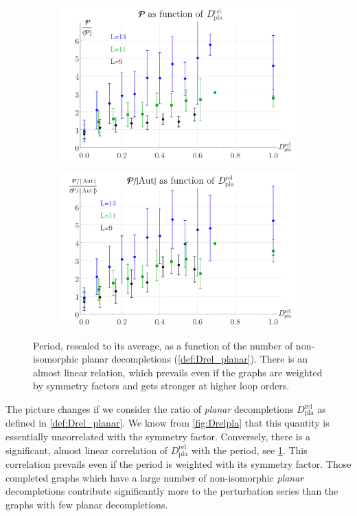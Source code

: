 \documentclass[11pt,a4paper]{article}
\renewcommand{\|}{\rule[-0.4ex]{0.2ex}{1.2em}}
\begin{document}
\begin{figure}[htbp]
	\begin{subfigure}[b]{.48 \textwidth}
		\includegraphics[width=\linewidth]{P_Drelpla}
		\subcaption{}
	\end{subfigure}
	\begin{subfigure}[b]{.48 \textwidth}
		\includegraphics[width=\linewidth]{PAut_Drelpla}
		\subcaption{}
	\end{subfigure}
	
	\caption{
		Period, rescaled to its average, as a function of the number of non-isomorphic planar decompletions (\cref{def:Drel_planar}). There is an almost linear relation, which prevails even if the graphs are weighted by symmetry factors and gets stronger at higher loop orders.}
	\label{fig:P_Drelpla}
\end{figure}



The picture changes if we consider the ratio of \emph{planar} decompletions  $D^\text{rel}_\text{pla}$ as defined in \cref{def:Drel_planar}. We know from \cref{fig:Drelpla} that this quantity is essentially uncorrelated with the symmetry factor. Conversely, there is a significant, almost linear correlation of $D^\text{rel}_\text{pla}$ with the period, see \cref{fig:P_Drelpla}. This correlation prevails even if the period is weighted with its symmetry factor. Those completed graphs which have a large number of non-isomorphic \emph{planar} decompletions   contribute significantly more to the perturbation series than the graphs with few planar decompletions. 
\end{document}
